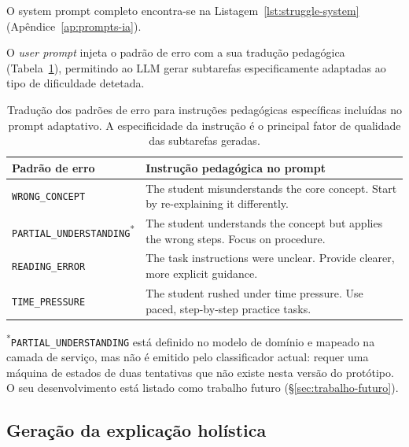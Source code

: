 O system prompt completo encontra-se na Listagem~\ref{lst:struggle-system}
(Ap\^endice~\ref{ap:prompts-ia}).

O \emph{user prompt} injeta o padr\~ao de erro com a sua tradu\c{c}\~ao
pedag\'ogica (Tabela~\ref{tab:error-patterns}), permitindo ao LLM gerar
subtarefas especificamente adaptadas ao tipo de dificuldade detetada.

\begin{table}[htbp]
	\centering
	\small
	\begin{tabular}{p{4.2cm} p{7.7cm}}
		\toprule
		\textbf{Padr\~ao de erro} & \textbf{Instru\c{c}\~ao pedag\'ogica no prompt} \\
		\midrule
		\texttt{WRONG\_CONCEPT}
			& The student misunderstands the core concept. Start by re-explaining it differently. \\
		\texttt{PARTIAL\_UNDERSTANDING}\textsuperscript{*}
			& The student understands the concept but applies the wrong steps. Focus on procedure. \\
		\texttt{READING\_ERROR}
			& The task instructions were unclear. Provide clearer, more explicit guidance. \\
		\texttt{TIME\_PRESSURE}
			& The student rushed under time pressure. Use paced, step-by-step practice tasks. \\
		\bottomrule
	\end{tabular}
	\caption[Mapeamento de padr\~oes de erro para instru\c{c}\~oes pedag\'ogicas no prompt]{Tradu\c{c}\~ao dos padr\~oes de erro para instru\c{c}\~oes pedag\'ogicas espec\'ificas inclu\'idas no prompt adaptativo. A especificidade da instru\c{c}\~ao \'e o principal fator de qualidade das subtarefas geradas.}
	\label{tab:error-patterns}
\end{table}
\noindent\textsuperscript{*}\small\texttt{PARTIAL\_UNDERSTANDING} est\'a definido no modelo de dom\'inio e mapeado na camada de servi\c{c}o, mas n\~ao \'e emitido pelo classificador actual: requer uma m\'aquina de estados de duas tentativas que n\~ao existe nesta vers\~ao do prot\'otipo. O seu desenvolvimento est\'a listado como trabalho futuro (\S\ref{sec:trabalho-futuro}).\normalsize

\subsection{Gera\c{c}\~ao da explica\c{c}\~ao hol\'istica}
\label{ssec:ia-explicacao}

